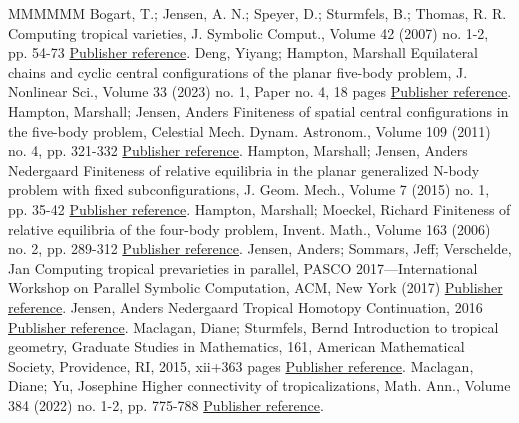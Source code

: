 \begin{thebibliography}{MMMMMM}
 Bogart, T.; Jensen, A. N.; Speyer, D.; Sturmfels, B.; Thomas, R. R. Computing tropical varieties, J. Symbolic Comput., Volume 42 (2007) no. 1-2, pp. 54-73 \href{https://alco.centre-mersenne.org/articles/10.5802/alco.327/#BJST07}{Publisher reference}.
 Deng, Yiyang; Hampton, Marshall Equilateral chains and cyclic central configurations of the planar five-body problem, J. Nonlinear Sci., Volume 33 (2023) no. 1, Paper no. 4, 18 pages \href{https://alco.centre-mersenne.org/articles/10.5802/alco.327/#DengHampton23}{Publisher reference}.
 Hampton, Marshall; Jensen, Anders Finiteness of spatial central configurations in the five-body problem, Celestial Mech. Dynam. Astronom., Volume 109 (2011) no. 4, pp. 321-332 \href{https://alco.centre-mersenne.org/articles/10.5802/alco.327/#HamptonJensen11}{Publisher reference}.
 Hampton, Marshall; Jensen, Anders Nedergaard Finiteness of relative equilibria in the planar generalized N-body problem with fixed subconfigurations, J. Geom. Mech., Volume 7 (2015) no. 1, pp. 35-42 \href{https://alco.centre-mersenne.org/articles/10.5802/alco.327/#HamptonJensen15}{Publisher reference}.
 Hampton, Marshall; Moeckel, Richard Finiteness of relative equilibria of the four-body problem, Invent. Math., Volume 163 (2006) no. 2, pp. 289-312 \href{https://alco.centre-mersenne.org/articles/10.5802/alco.327/#HamptonMoeckel06}{Publisher reference}.
 Jensen, Anders; Sommars, Jeff; Verschelde, Jan Computing tropical prevarieties in parallel, PASCO 2017—International Workshop on Parallel Symbolic Computation, ACM, New York (2017) \href{https://alco.centre-mersenne.org/articles/10.5802/alco.327/#JSV17}{Publisher reference}.
 Jensen, Anders Nedergaard Tropical Homotopy Continuation, 2016 \href{https://alco.centre-mersenne.org/articles/10.5802/alco.327/#Jensen16}{Publisher reference}.
 Maclagan, Diane; Sturmfels, Bernd Introduction to tropical geometry, Graduate Studies in Mathematics, 161, American Mathematical Society, Providence, RI, 2015, xii+363 pages \href{https://alco.centre-mersenne.org/articles/10.5802/alco.327/#MaclaganSturmfels15}{Publisher reference}.
 Maclagan, Diane; Yu, Josephine Higher connectivity of tropicalizations, Math. Ann., Volume 384 (2022) no. 1-2, pp. 775-788 \href{https://alco.centre-mersenne.org/articles/10.5802/alco.327/#MaclaganYu21}{Publisher reference}.

\end{thebibliography}
